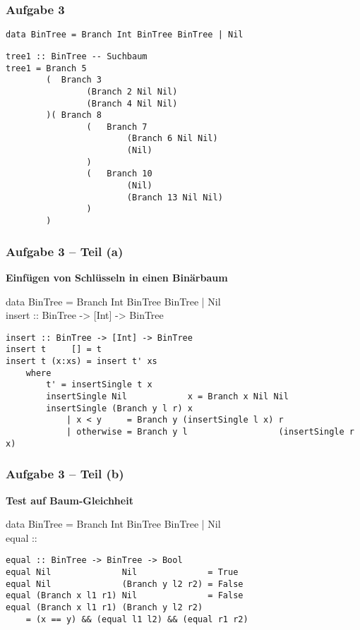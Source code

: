 \documentclass{beamer}
\begin{document}
\begin{frame}[t, fragile] \frametitle{Aufgabe 3}
	\begin{lstlisting}
data BinTree = Branch Int BinTree BinTree | Nil
	\end{lstlisting}
	\pause
	\begin{lstlisting}[firstnumber=2, basicstyle=\ttfamily\scriptsize]
tree1 :: BinTree -- Suchbaum  
tree1 = Branch 5 
		(  Branch 3 
				(Branch 2 Nil Nil) 
				(Branch 4 Nil Nil)
		)( Branch 8 
				(	Branch 7 
						(Branch 6 Nil Nil) 
						(Nil)
				)
				(	Branch 10 
						(Nil)
						(Branch 13 Nil Nil)
				)
		)
	\end{lstlisting}
\end{frame}

\begin{frame}[t, fragile] \frametitle{Aufgabe 3 -- Teil (a)}
	\textbf{Einfügen von Schlüsseln in einen Binärbaum}
	
	\begin{ttfamily}
		data BinTree = Branch Int BinTree BinTree | Nil \\
		insert :: BinTree -> [Int] -> BinTree
	\end{ttfamily}
	
	\bigskip \pause
	
	\begin{lstlisting}
insert :: BinTree -> [Int] -> BinTree
insert t     [] = t
insert t (x:xs) = insert t' xs
	where
		t' = insertSingle t x
		insertSingle Nil            x = Branch x Nil Nil
		insertSingle (Branch y l r) x
			| x < y     = Branch y (insertSingle l x) r
			| otherwise = Branch y l                  (insertSingle r x)
	\end{lstlisting}
\end{frame}

\begin{frame}[t, fragile] \frametitle{Aufgabe 3 -- Teil (b)}
	\textbf{Test auf Baum-Gleichheit}
	
	\begin{ttfamily}
		data BinTree = Branch Int BinTree BinTree | Nil \\
		equal :: \only<2>{BinTree -> BinTree -> Bool}
	\end{ttfamily}
	
	\bigskip \pause
	
	\begin{lstlisting}
equal :: BinTree -> BinTree -> Bool
equal Nil              Nil              = True
equal Nil              (Branch y l2 r2) = False
equal (Branch x l1 r1) Nil              = False
equal (Branch x l1 r1) (Branch y l2 r2)
	= (x == y) && (equal l1 l2) && (equal r1 r2)
	\end{lstlisting}
\end{frame}
\end{document}

